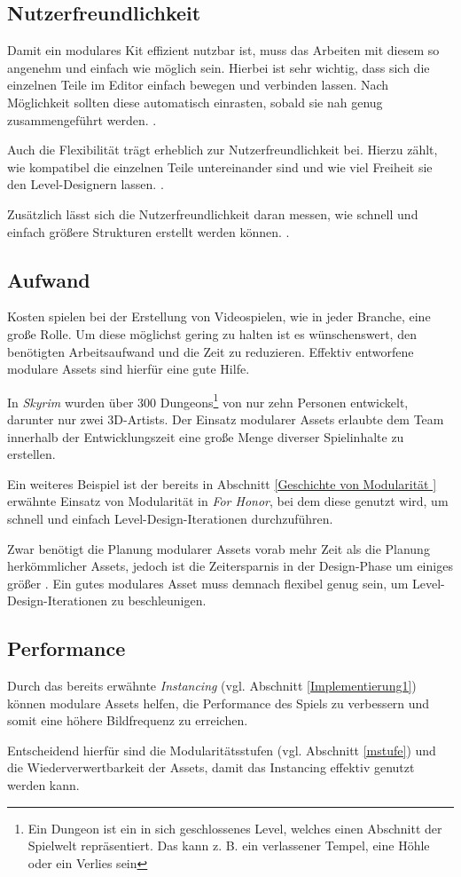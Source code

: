 \subsection{Nutzerfreundlichkeit}
Damit ein modulares Kit effizient nutzbar ist, muss das Arbeiten mit diesem so angenehm und einfach wie möglich sein. Hierbei ist sehr wichtig, dass sich die einzelnen Teile im Editor einfach bewegen  und verbinden lassen. Nach Möglichkeit sollten diese automatisch einrasten, sobald sie nah genug zusammengeführt werden. \parencite{Mader}.
\par
Auch die Flexibilität trägt erheblich zur Nutzerfreundlichkeit bei. Hierzu zählt, wie kompatibel die einzelnen Teile untereinander sind und wie viel Freiheit sie den Level-Designern lassen. \parencite{unrealModular}.
\par
Zusätzlich lässt sich die Nutzerfreundlichkeit daran messen, wie schnell und einfach größere Strukturen erstellt werden können. \parencite{Mader}.
\subsection{Aufwand}
Kosten spielen bei der Erstellung von Videospielen, wie in jeder Branche, eine große Rolle. Um diese möglichst gering zu halten ist es wünschenswert, den benötigten Arbeitsaufwand und die Zeit zu reduzieren. Effektiv entworfene modulare Assets sind hierfür eine gute Hilfe.
\par
In \textit{Skyrim} wurden über 300 Dungeons\footnote{Ein Dungeon ist ein in sich geschlossenes Level, welches einen Abschnitt der Spielwelt repräsentiert. Das kann z. B. ein verlassener Tempel, eine Höhle oder ein Verlies sein} von nur zehn Personen entwickelt, darunter nur zwei 3D-Artists. Der Einsatz modularer Assets erlaubte dem Team innerhalb der Entwicklungszeit eine große Menge diverser Spielinhalte zu erstellen. \parencite{Burgess}
\par
Ein weiteres Beispiel ist der bereits in Abschnitt \ref{Geschichte von Modularität } erwähnte Einsatz von Modularität in  \textit{For Honor}, bei dem diese genutzt wird, um schnell und einfach Level-Design-Iterationen durchzuführen. \parencite{ForHonor}
\par
Zwar benötigt die Planung modularer Assets vorab mehr Zeit als die Planung herkömmlicher Assets, jedoch ist die Zeitersparnis in der Design-Phase um einiges größer \parencite{Meler}. Ein gutes modulares Asset muss demnach flexibel genug sein, um Level-Design-Iterationen zu beschleunigen.
\subsection{Performance}
Durch das bereits erwähnte \textit{Instancing} (vgl. Abschnitt \ref{Implementierung1}) können modulare Assets helfen, die Performance des Spiels zu verbessern und somit eine höhere Bildfrequenz zu erreichen.
\par
Entscheidend hierfür sind die Modularitätsstufen (vgl. Abschnitt \ref{mstufe}) und die Wiederverwertbarkeit der Assets, damit das Instancing effektiv genutzt werden kann.
\newpage
